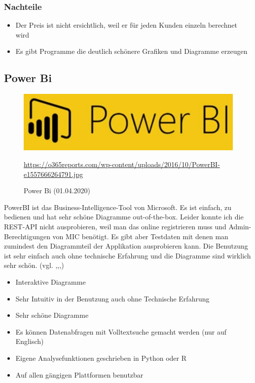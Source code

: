\subsubsection{Nachteile}
\begin{itemize}
\item Der Preis ist nicht ersichtlich, weil er für jeden Kunden einzeln berechnet wird
\item Es gibt Programme die deutlich schönere Grafiken und Diagramme erzeugen
\end{itemize}

\subsection{Power Bi}
\begin{figure}[H]
    \includegraphics[scale=0.6]{images/PowerBiLogo.PNG}
    \caption{Power Bi (01.04.2020)}
     \centering
     \url{https://o365reports.com/wp-content/uploads/2016/10/PowerBI-e1557666264791.jpg} 
\end{figure}
PowerBI ist das Business-Intelligence-Tool von Microsoft. Es ist einfach, zu bedienen und hat sehr schöne Diagramme out-of-the-box. Leider konnte ich die REST-API nicht ausprobieren, weil man das online registrieren muss und Admin-Berechtigungen von MIC benötigt. Es gibt aber Testdaten mit denen man zumindest den Diagrammteil der Applikation ausprobieren kann. Die Benutzung ist sehr einfach auch ohne technische Erfahrung und die Diagramme sind wirklich sehr schön. (vgl. \cite{noauthor_power_2019-1},\cite{noauthor_downloads_2019},\cite{rkarlin_what_2019},\cite{noauthor_power_2019})
\begin{itemize}
\item Interaktive Diagramme
\item Sehr Intuitiv in der Benutzung auch ohne Technische Erfahrung
\item Sehr schöne Diagramme
\item Es können Datenabfragen mit Volltextsuche gemacht werden (nur auf Englisch)
\item Eigene Analysefunktionen geschrieben in Python oder R
\item Auf allen gängigen Plattformen benutzbar
\end{itemize}
